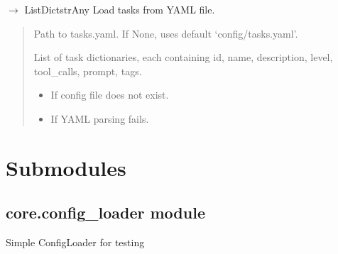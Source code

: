 \documentclass[letterpaper,10pt,english]{sphinxmanual}
\begin{document}

\begin{fulllineitems}
\label{\detokenize{core.utils:core.utils.load_tasks}}
\pysigstartsignatures
\pysiglinewithargsret
{}
{}
{{ $\rightarrow$ List\DUrole{p}{{[}}Dict\DUrole{p}{{[}}strAny\DUrole{p}{{]}}\DUrole{p}{{]}}}}
\pysigstopsignatures
\sphinxAtStartPar
Load tasks from YAML file.
\begin{quote}\begin{description}
\sphinxAtStartPar
{} \textendash{} Path to tasks.yaml. If None, uses default ‘config/tasks.yaml’.

\sphinxAtStartPar
List of task dictionaries, each containing id, name, description,
level, tool\_calls, prompt, tags.

\begin{itemize}
\item {} 
\sphinxAtStartPar
{} \textendash{} If config file does not exist.

\item {} 
\sphinxAtStartPar
{} \textendash{} If YAML parsing fails.

\end{itemize}

\end{description}\end{quote}

\end{fulllineitems}



\section{Submodules}
\label{\detokenize{core:submodules}}
\sphinxstepscope


\subsection{core.config\_loader module}
\label{\detokenize{core.config_loader:module-core.config_loader}}\label{\detokenize{core.config_loader:core-config-loader-module}}\label{\detokenize{core.config_loader::doc}}
\sphinxAtStartPar
Simple ConfigLoader for testing
\end{document}
